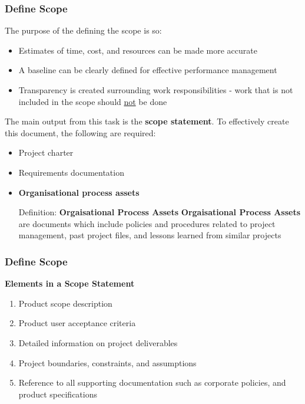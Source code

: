 \documentclass{beamer}
\begin{document}
\begin{frame}
\frametitle{Define Scope}
\small
The purpose of the defining the scope is so:
\begin{itemize}
\item Estimates of time, cost, and resources can be made more accurate
\item A baseline can be clearly defined for effective performance management
\item Transparency is created surrounding work responsibilities - work that is not included in the scope should \underline{not} be done
\end{itemize}

The main output from this task is the \textbf{scope statement}. To effectively create this document, the following are required:
\begin{itemize}
\item Project charter
\item Requirements documentation
\item \textbf{Organisational process assets}

\begin{block}{Definition: \textbf{Orgaisational Process Assets}}
\textbf{Orgaisational Process Assets} are documents which include policies and procedures related to project management, past project files, and lessons learned from similar projects
\end{block}
\end{itemize}
\end{frame}

\begin{frame}
\frametitle{Define Scope}
\begin{tcolorbox}
\textbf{Elements in a Scope Statement}
\begin{enumerate}
\item Product scope description
\item Product user acceptance criteria
\item Detailed information on project deliverables
\item Project boundaries, constraints, and assumptions
\item Reference to all supporting documentation such as corporate policies, and product specifications
\end{enumerate}
\end{tcolorbox}
\end{frame}

\end{document}
